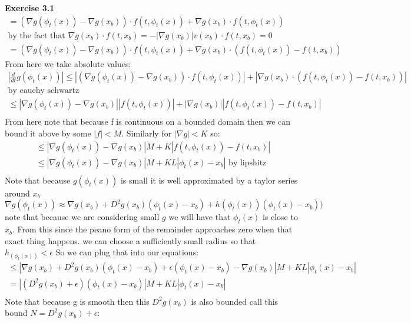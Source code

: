 \documentclass[12pt]{article}
\newenvironment{exercise}[1]{\vspace{.1in}\noindent\textbf{Exercise #1 \hspace{.05em}}}{}
\theoremstyle{definition}
\theoremstyle{remark}
\begin{document}
\begin{exercise}{3.1}
	\begin{align}
		=(\nabla g(\phi_t(x))-\nabla g(x_b))\cdot f(t,\phi_t(x))+\nabla g(x_b)\cdot f(t,\phi_t(x)) \\
		\text{by the fact that }\nabla g(x_b)\cdot f(t,x_b)=-|\nabla g(x_b)|v(x_b)\cdot f(t,x_b)=0 \\
		=(\nabla g(\phi_t(x))-\nabla g(x_b))\cdot f(t,\phi_t(x))+\nabla g(x_b)\cdot (f(t,\phi_t(x))-f(t,x_b))
	\end{align}
	From here we take absolute values:
	\begin{align}
		|\frac{d}{dt}g(\phi_t(x))| \leq |(\nabla g(\phi_t(x))-\nabla g(x_b))\cdot f(t,\phi_t(x))|+|\nabla g(x_b)\cdot (f(t,\phi_t(x))-f(t,x_b))| \\
		\text{by cauchy schwartz}                                                                                                                \\
		\leq |\nabla g(\phi_t(x))-\nabla g(x_b)||f(t,\phi_t(x))|+|\nabla g(x_b)||f(t,\phi_t(x))-f(t,x_b)|                                        \\
	\end{align}
	From here note that because f is continuous on a bounded domain then we can bound it above by some $|f|<M$. Similarly for $|\nabla g|<K$ so:
	\begin{align}
		\leq  |\nabla g(\phi_t(x))-\nabla g(x_b)|M+K|f(t,\phi_t(x))-f(t,x_b)|            \\
		\leq  |\nabla g(\phi_t(x))-\nabla g(x_b)|M+KL|\phi_t(x)-x_b| \text{ by lipshitz} \\
	\end{align}
	Note that because $g(\phi_t(x))$ is small it is well approximated by a taylor  series around $x_b$ $\nabla g(\phi_t(x))\approx \nabla g(x_b)+D^2g(x_b)(\phi_t(x)-x_b)+h(\phi_t(x))(\phi_t(x)-x_b))$ note that because we are considering small $g$ we will have that $\phi_t(x)$ is close to $x_b$. From this since the peano form of the remainder approaches zero when that exact thing happens. we can choose a sufficiently small radius so that $h_(\phi_t(x))<\epsilon$  So we can plug that into our equations:
	\begin{align}
		\leq |\nabla g(x_b)+D^2g(x_b)(\phi_t(x)-x_b) + \epsilon (\phi_t(x)-x_b)-\nabla g(x_b)|M+KL|\phi_t(x)-x_b| \\
		= |(D^2g(x_b)+\epsilon)(\phi_t(x)-x_b)|M+KL|\phi_t(x)-x_b|                                                \\
	\end{align}
	Note that because g is smooth then this $D^2g(x_b)$ is also bounded call this bound $N=D^2g(x_b)+\epsilon$:


\end{exercise}
\end{document}
